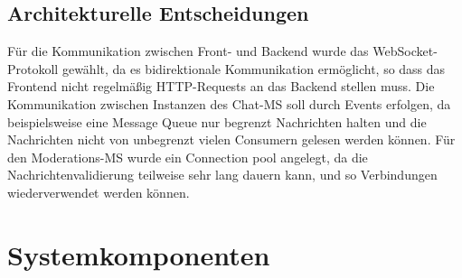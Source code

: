 \documentclass[12pt]{report}
\begin{document}
\subsection{Architekturelle Entscheidungen}
Für die Kommunikation zwischen Front- und Backend wurde das WebSocket-Protokoll gewählt, da es bidirektionale Kommunikation ermöglicht, so dass das Frontend nicht regelmäßig HTTP-Requests an das Backend stellen muss. 
Die Kommunikation zwischen Instanzen des Chat-MS soll durch Events erfolgen, da beispielsweise eine Message Queue nur begrenzt Nachrichten halten und die Nachrichten nicht von unbegrenzt vielen Consumern gelesen werden können.
Für den Moderations-MS wurde ein Connection pool angelegt, da die Nachrichtenvalidierung teilweise sehr lang dauern kann, und so Verbindungen wiederverwendet werden können.
\section{Systemkomponenten}
\end{document}
